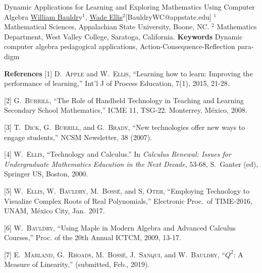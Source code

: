 \begin{abstract_online}{Dynamic Applications for Learning and Exploring Mathematics Using Computer Algebra}{%
        \underline{William Bauldr}y$^{1}$, \underline{Wade Ellis}$^{2}$}{[BauldryWC@appstate.edu]
        }{%
        $^1$ Mathematical Sciences, Appalachian State University, Boone, NC. \newline{}
        $^2$ Mathematics Department, West Valley College, Saratoga, California.%
        }
\textbf{Keywords} \newline{} 
Dynamic computer algebra pedagogical applications, Action-Consequence-Reflection para- digm

\textbf{References} \newline{}
[1] \textsc{D.~Apple} and \textsc{W.~Ellis}, ``Learning how to learn: Improving the performance of learning,'' Int'l J of Process Education, 7(1), 2015, 21-28.

[2] \textsc{G.~Burrill}, ``The Role of Handheld Technology in Teaching and Learning Secondary School Mathematics,'' ICME 11, TSG-22. Monterrey, M\'{e}xico, 2008.

[3] \textsc{T.~Dick}, \textsc{G.~Burrill}, and \textsc{G.~Brady}, ``New technologies offer new ways to engage students,'' NCSM Newsletter, 38 (2007).

[4] \textsc{W.~Ellis}, ``Technology and Calculus.'' In \emph{Calculus Renewal: Issues for Undergraduate Mathematics Education in the Next Decade}, 53-68, S.~Ganter (ed), Springer US, Boston, 2000.

[5] \textsc{W.~Ellis, W.~Bauldry, M.~Boss\'e,} and \textsc{S, Oteh}, ``Employing Technology to Visualize Complex Roots of Real Polynomials,'' Electronic Proc.~of TIME-2016, UNAM, M\'{e}xico City, Jan.~2017.

[6] \textsc{W.~Bauldry}, ``Using Maple in Modern Algebra and Advanced Calculus Courses,'' Proc. of the 20th Annual ICTCM, 2009, 13-17.

[7] \textsc{E.~Marland}, \textsc{G.~Rhoads}, \textsc{M.~Boss\'e}, \textsc{J.~Sanqui}, and \textsc{W.~Bauldry}, ``$Q^2$: A Measure of Linearity,'' (submitted, Feb., 2019).
\end{abstract_online}
